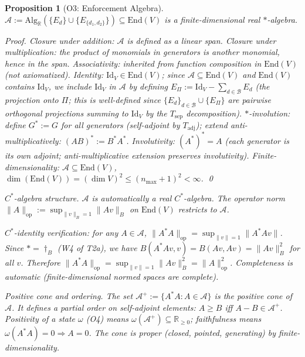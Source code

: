 \documentclass[11pt,a4paper]{article}
\newtheorem{proposition}[theorem]{Proposition}
\theoremstyle{definition}
\newcommand{\End}{\mathrm{End}}
\begin{document}
\begin{proposition}[O3: Enforcement Algebra]\label{prop:O3}
$\mathcal{A} := \mathrm{Alg}_\mathbb{R}(\{E_d\} \cup \{E_{\{d_1,d_2\}}\}) \subseteq \End(V)$ is a finite-dimensional real $*$-algebra.

\noindent\textit{Proof.}  Closure under addition: $\mathcal{A}$ is defined as a linear span.  Closure under multiplication: the product of monomials in generators is another monomial, hence in the span.  Associativity: inherited from function composition in $\End(V)$ (not axiomatized).  Identity: $\mathrm{Id}_V \in \End(V)$; since $\mathcal{A} \subseteq \End(V)$ and $\End(V)$ contains $\mathrm{Id}_V$, we include $\mathrm{Id}_V$ in $\mathcal{A}$ by defining $E_\Pi := \mathrm{Id}_V - \sum_{d \in \mathcal{B}} E_d$ (the projection onto $\Pi$; this is well-defined since $\{E_d\}_{d \in \mathcal{B}} \cup \{E_\Pi\}$ are pairwise orthogonal projections summing to $\mathrm{Id}_V$ by the $T_{\mathrm{sep}}$ decomposition).  $*$-involution: define $G^* := G$ for all generators (self-adjoint by $T_{\mathrm{adj}}$); extend anti-multiplicatively: $(AB)^* := B^*A^*$.  Involutivity: $(A^*)^* = A$ (each generator is its own adjoint; anti-multiplicative extension preserves involutivity).  Finite-dimensionality: $\mathcal{A} \subseteq \End(V)$, $\dim(\End(V)) = (\dim V)^2 \le (n_{\max}+1)^2 < \infty$.  \qed

\smallskip\noindent\textit{$C^*$-algebra structure.}  $\mathcal{A}$ is automatically a real $C^*$-algebra.  The operator norm $\|A\|_{\mathrm{op}} := \sup_{\|v\|_B = 1} \|Av\|_B$ on $\End(V)$ restricts to $\mathcal{A}$.

\textit{$C^*$-identity verification:} for any $A \in \mathcal{A}$, $\|A^*A\|_{\mathrm{op}} = \sup_{\|v\|=1} \|A^*Av\|$.  Since $* = \dagger_B$ (W4 of T2a), we have $B(A^*Av, v) = B(Av, Av) = \|Av\|_B^2$ for all $v$.  Therefore $\|A^*A\|_{\mathrm{op}} = \sup_{\|v\|=1} \|Av\|_B^2 = \|A\|_{\mathrm{op}}^2$.  Completeness is automatic (finite-dimensional normed spaces are complete).

\textit{Positive cone and ordering.}  The set $\mathcal{A}^+ := \{A^*A : A \in \mathcal{A}\}$ is the positive cone of $\mathcal{A}$.  It defines a partial order on self-adjoint elements: $A \ge B$ iff $A - B \in \mathcal{A}^+$.  Positivity of a state $\omega$ (O4) means $\omega(\mathcal{A}^+) \subseteq \mathbb{R}_{\ge 0}$; faithfulness means $\omega(A^*A) = 0 \Rightarrow A = 0$.  The cone is proper (closed, pointed, generating) by finite-dimensionality.


\end{proposition}
\end{document}

